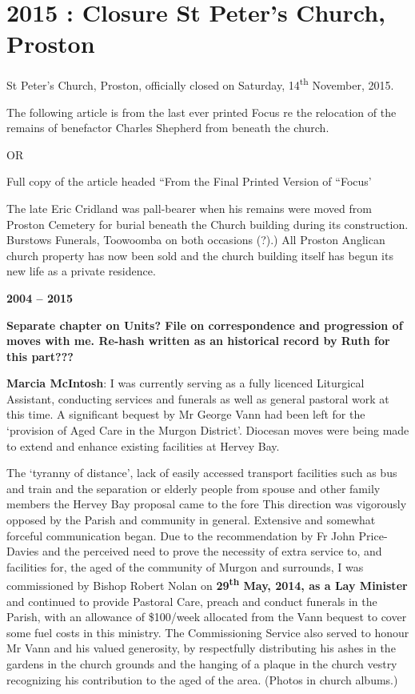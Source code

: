 \hypertarget{closure-st-peters-church-proston}{%
\section{2015 : Closure St Peter's Church,
Proston}\label{closure-st-peters-church-proston}}

St Peter's Church, Proston, officially closed on Saturday,
14\textsuperscript{th} November, 2015.

The following article is from the last ever printed Focus re the
relocation of the remains of benefactor Charles Shepherd from beneath
the church.

OR

Full copy of the article headed ``From the Final Printed Version of
``Focus'

The late Eric Cridland was pall-bearer when his remains were moved from
Proston Cemetery for burial beneath the Church building during its
construction. Burstows Funerals, Toowoomba on both occasions (?).) All
Proston Anglican church property has now been sold and the church
building itself has begun its new life as a private residence.

\textbf{2004 -- 2015}

\textbf{Separate chapter on Units? File on correspondence and
progression of moves with me. Re-hash written as an historical record by
Ruth for this part???}

\textbf{Marcia McIntosh}: I was currently serving as a fully licenced
Liturgical Assistant, conducting services and funerals as well as
general pastoral work at this time. A significant bequest by Mr George
Vann had been left for the `provision of Aged Care in the Murgon
District'. Diocesan moves were being made to extend and enhance existing
facilities at Hervey Bay.

The `tyranny of distance', lack of easily accessed transport facilities
such as bus and train and the separation or elderly people from spouse
and other family members the Hervey Bay proposal came to the fore This
direction was vigorously opposed by the Parish and community in general.
Extensive and somewhat forceful communication began. Due to the
recommendation by Fr John Price-Davies and the perceived need to prove
the necessity of extra service to, and facilities for, the aged of the
community of Murgon and surrounds, I was commissioned by Bishop Robert
Nolan on \textbf{29\textsuperscript{th} May, 2014, as a Lay Minister}
and continued to provide Pastoral Care, preach and conduct funerals in
the Parish, with an allowance of \$100/week allocated from the Vann
bequest to cover some fuel costs in this ministry. The Commissioning
Service also served to honour Mr Vann and his valued generosity, by
respectfully distributing his ashes in the gardens in the church grounds
and the hanging of a plaque in the church vestry recognizing his
contribution to the aged of the area. (Photos in church albums.)

